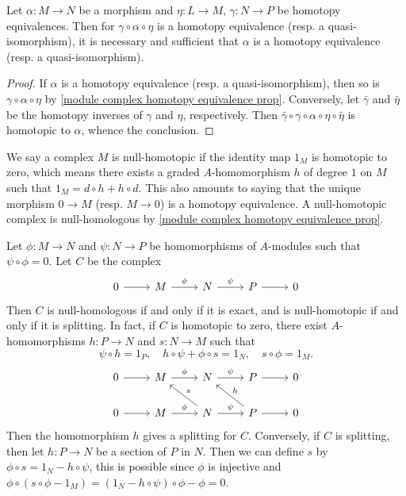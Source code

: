 \begin{corollary}
Let $\alpha:M\to N$ be a morphism and $\eta:L\to M$, $\gamma:N\to P$ be homotopy equivalences. Then for $\gamma\circ\alpha\circ\eta$ is a homotopy equivalence (resp. a quasi-isomorphism), it is necessary and sufficient that $\alpha$ is a homotopy equivalence (resp. a quasi-isomorphism).
\end{corollary}
\begin{proof}
If $\alpha$ is a homotopy equivalence (resp. a quasi-isomorphism), then so is $\gamma\circ\alpha\circ\eta$ by \cref{module complex homotopy equivalence prop}. Conversely, let $\bar{\gamma}$ and $\bar{\eta}$ be the homotopy inverses of $\gamma$ and $\eta$, respectively. Then $\bar{\gamma}\circ\gamma\circ\alpha\circ\eta\circ\bar{\eta}$ is homotopic to $\alpha$, whence the conclusion. 
\end{proof}
We say a complex $M$ is null-homotopic if the identity map $1_M$ is homotopic to zero, which means there exists a graded $A$-homomorphism $h$ of degree $1$ on $M$ such that $1_M=d\circ h+h\circ d$. This also amounts to saying that the unique morphism $0\to M$ (resp. $M\to 0$) is a homotopy equivalence. A null-homotopic complex is null-homologous by \cref{module complex homotopy equivalence prop}.
\begin{example}
Let $\phi:M\to N$ and $\psi:N\to P$ be homomorphisms of $A$-modules such that $\psi\circ\phi=0$. Let $C$ be the complex
\[\begin{tikzcd}
0\ar[r]&M\ar[r,"\phi"]&N\ar[r,"\psi"]&P\ar[r]&0
\end{tikzcd}\]
Then $C$ is null-homologous if and only if it is exact, and is null-homotopic if and only if it is splitting. In fact, if $C$ is homotopic to zero, there exist $A$-homomorphisms $h:P\to N$ and $s:N\to M$ such that
\[\psi\circ h=1_P,\quad h\circ\psi+\phi\circ s=1_N,\quad s\circ\phi=1_M.\]
\[\begin{tikzcd}
0\ar[r]&M\ar[r,"\phi"]&N\ar[r,"\psi"]&P\ar[r]&0\\
0\ar[r]&M\ar[r,"\phi"]&N\ar[lu,swap,"s"]\ar[r,"\psi"]&P\ar[r]\ar[lu,swap,"h"]&0
\end{tikzcd}\]
Then the homomorphism $h$ gives a splitting for $C$. Conversely, if $C$ is splitting, then let $h:P\to N$ be a section of $P$ in $N$. Then we can define $s$ by $\phi\circ s=1_N-h\circ\psi$, this is possible since $\phi$ is injective and $\phi\circ(s\circ\phi-1_M)=(1_N-h\circ\psi)\circ\phi-\phi=0$.
\end{example}
